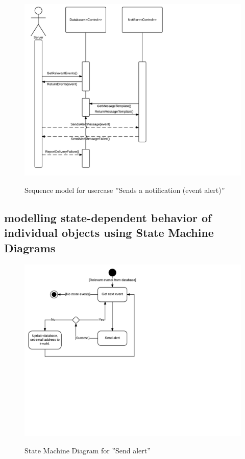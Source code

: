 \documentclass{article}
\begin{document}
		\clearpage
	\begin{figure}[!htb]
                \caption{Sequence model for usercase ''Sends a notification (event alert)''}
		\includegraphics[scale = 0.6]{SequenceModelSendEventAlert.png}\\
		\pagebreak{}
	\end{figure}

		\clearpage
\subsection{modelling state-dependent behavior of individual objects using State Machine Diagrams}


	\begin{figure}[!htb]
                \caption{State Machine Diagram for ''Send alert''}
		\includegraphics[scale = 0.6]{SendAlertStateMachine.png}\\
		\pagebreak{}
	\end{figure}
\end{document}
